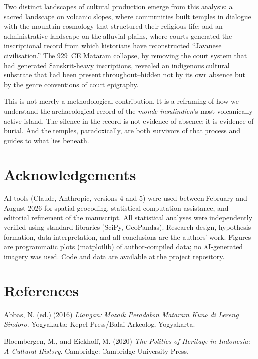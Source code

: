 \documentclass[12pt,a4paper]{article}
\begin{document}
Two distinct landscapes of cultural production emerge from this analysis: a sacred landscape on volcanic slopes, where communities built temples in dialogue with the mountain cosmology that structured their religious life; and an administrative landscape on the alluvial plains, where courts generated the inscriptional record from which historians have reconstructed ``Javanese civilisation.''
The 929~CE Mataram collapse, by removing the court system that had generated Sanskrit-heavy inscriptions, revealed an indigenous cultural substrate that had been present throughout--hidden not by its own absence but by the genre conventions of court epigraphy.

This is not merely a methodological contribution.
It is a reframing of how we understand the archaeological record of the \emph{monde insulindien}'s most volcanically active island.
The silence in the record is not evidence of absence; it is evidence of burial.
And the temples, paradoxically, are both survivors of that process and guides to what lies beneath.

\section*{Acknowledgements}

\noindent AI tools (Claude, Anthropic, versions 4 and 5) were used between February and August 2026 for spatial geocoding, statistical computation assistance, and editorial refinement of the manuscript. All statistical analyses were independently verified using standard libraries (SciPy, GeoPandas). Research design, hypothesis formation, data interpretation, and all conclusions are the authors' work. Figures are programmatic plots (matplotlib) of author-compiled data; no AI-generated imagery was used. Code and data are available at the project repository.


\section*{References}

\noindent Abbas, N. (ed.) (2016) \emph{Liangan: Mozaik Peradaban Mataram Kuno di Lereng Sindoro}. Yogyakarta: Kepel Press/Balai Arkeologi Yogyakarta.

\vspace{0.5em}
\noindent Bloembergen, M., and Eickhoff, M. (2020) \emph{The Politics of Heritage in Indonesia: A Cultural History}. Cambridge: Cambridge University Press.
\end{document}

